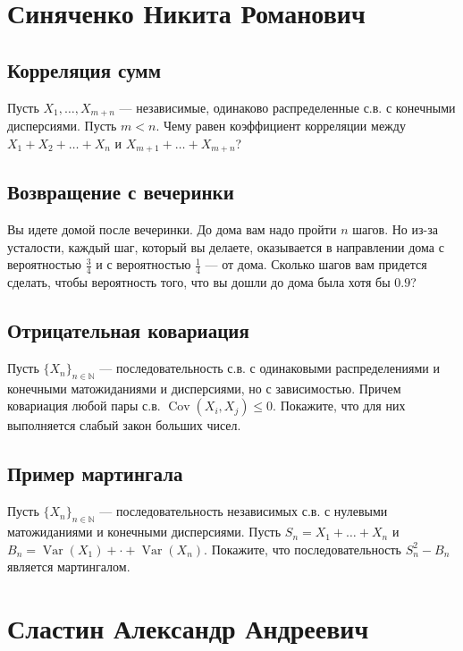 \documentclass[12pt]{article}
\newcommand\N{\mathbb{N}}
\DeclareMathOperator{\Var}{Var}
\DeclareMathOperator{\Cov}{Cov}
\begin{document}
\newpage
\section{Синяченко Никита Романович}

\subsection{Корреляция сумм}

Пусть $X_1, \dots, X_{m + n}$ --- независимые, одинаково распределенные с.в. с конечными дисперсиями. Пусть $m < n$. Чему равен коэффициент корреляции между $X_1 + X_2 + \dots + X_n$ и $X_{m + 1} + \dots + X_{m + n}$?

\subsection{Возвращение с вечеринки}

Вы идете домой после вечеринки. До дома вам надо пройти $n$ шагов. Но из-за усталости, каждый шаг, который вы делаете, оказывается в направлении дома с вероятностью $\frac{3}{4}$ и с вероятностью $\frac{1}{4}$ --- от дома. Сколько шагов вам придется сделать, чтобы вероятность того, что вы дошли до дома была хотя бы $0.9$?

\subsection{Отрицательная ковариация}

Пусть $\{X_n\}_{n \in \N}$ --- последовательность с.в. с одинаковыми распределениями и конечными матожиданиями и дисперсиями, но с зависимостью. Причем ковариация любой пары с.в. $\Cov(X_i, X_j) \le 0$. Покажите, что для них выполняется слабый закон больших чисел.


\subsection{Пример мартингала}

Пусть $\{X_n\}_{n \in \N}$ --- последовательность независимых с.в. с нулевыми матожиданиями и конечными дисперсиями. Пусть $S_n = X_1 + \dots + X_n$ и $B_n = \Var(X_1) + \cdot + \Var(X_n)$. Покажите, что последовательность $S_n^2 - B_n$ является мартингалом.


\newpage
\section{Сластин Александр Андреевич}
\end{document}
